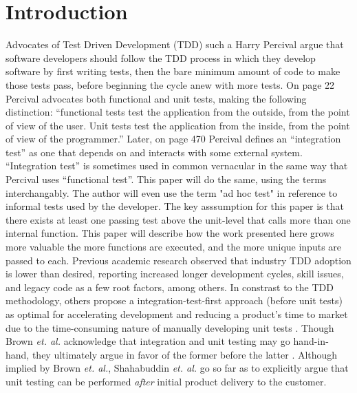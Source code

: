 \section{Introduction}\label{sec:introduction}



Advocates of Test Driven Development (TDD) such a Harry Percival
 \cite{percival2014test} argue that software developers should
follow the TDD process in which they develop software by first writing tests,
then the bare minimum amount of code to make those tests pass,
before beginning the cycle anew with more tests.
%
On page 22 \cite{percival2014test} Percival advocates both functional and
 unit tests, making the following distinction:
“functional tests test the application from the outside, from the point of view
of the user. Unit tests test the application from the inside,
from the point of view of the programmer.”
%
Later, on page 470 \cite{percival2014test} Percival defines an “integration test” as
one that depends on and interacts with some external system.
%
“Integration test” is sometimes used in common vernacular in the same way that
Percival uses “functional test”.
%
This paper will do the same, using the terms interchangably.  The author will 
even use the term "ad hoc test" in reference to informal tests used by the developer.  
The key asssumption for this paper is that there exists at least one passing 
test above the unit-level that calls more than one internal function.  This 
paper will describe how the work presented here grows more valuable the 
more functions are executed, and the more unique inputs are passed to each.
%
Previous academic research \cite{causevic2011factors, ramzan2024test} observed
 that industry TDD adoption is lower than desired,
reporting increased longer development cycles, skill issues, and legacy code as 
a few root factors, among others.
%
In constrast to the TDD methodology, 
others \cite{brown2013agility, shahabuddin2016integration} propose a 
integration-test-first approach (before unit tests)
as optimal for accelerating development 
and reducing a product's time to market due to the time-consuming nature of manually
developing unit tests \cite{kahur2023java, shahabuddin2016integration}.
Though Brown \textit{et. al.} 
acknowledge that integration and unit testing may go hand-in-hand, they 
ultimately argue in favor of the former before the latter \cite{brown2013agility}.  
Although implied by Brown \textit{et. al.}, Shahabuddin \textit{et. al.} 
\cite{shahabuddin2016integration} go so far as to explicitly argue that unit
testing can be performed \textit{after} initial product delivery to the customer.
